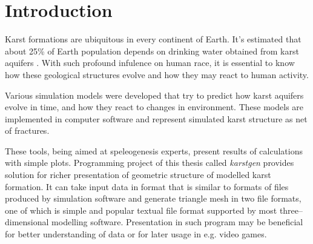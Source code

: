 \chapter{Introduction}

%




Karst formations are ubiquitous in every continent of Earth. It's estimated that
about 25\% of Earth population depends on drinking water obtained from karst
aquifers \parencite{ford2007karst}. With such profound infulence on human race,
it is essential to know how these geological structures evolve and how they may
react to human activity.

Various simulation models were developed that try to predict how karst aquifers
evolve in time, and how they react to changes in environment. These models are
implemented in computer software and represent simulated karst structure as
net of fractures.

These tools, being aimed at speleogenesis experts, present results of
calculations with simple plots. Programming project of this thesis called \emph{karstgen} provides
solution for richer presentation of geometric structure of modelled karst
formation. It can take input data in format that is similar to formats of files
produced by simulation software and generate triangle mesh in two file formats,
one of which is simple and popular textual file format supported by most
three--dimensional modelling software. Presentation in such program may be
beneficial for better understanding of data or for later usage in e.g. video
games.

